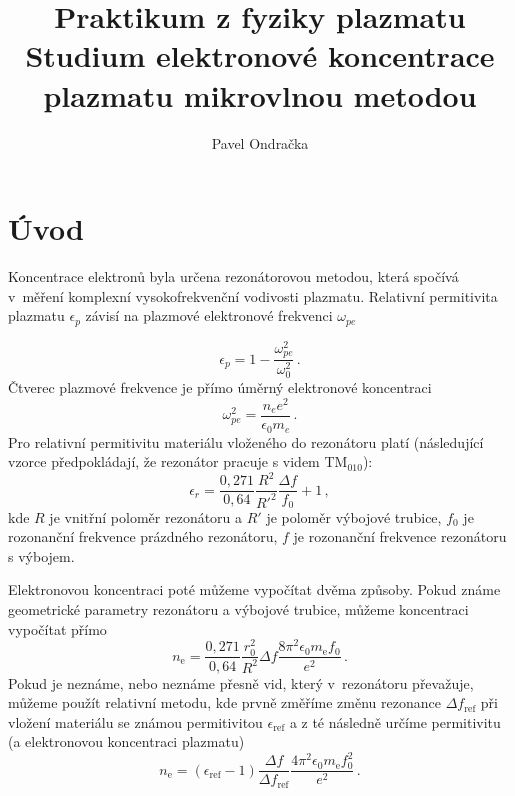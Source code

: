\documentclass[12pt]{article}
\begin{document}
\title{Praktikum z fyziky plazmatu \\
Studium elektronové koncentrace plazmatu mikrovlnou metodou}
\author{Pavel Ondračka}
\maketitle

\section{Úvod}
Koncentrace elektronů byla určena rezonátorovou metodou, která spočívá v~měření komplexní vysokofrekvenční vodivosti plazmatu.
Relativní permitivita plazmatu $\epsilon_p$ závisí na plazmové elektronové frekvenci $\omega_{pe}$ 

\begin{equation}
\epsilon_p = 1 - \frac{\omega_{pe}^2}{\omega_0^2} \, \mathrm{.}
\end{equation}
Čtverec plazmové frekvence je přímo úměrný elektronové koncentraci
\begin{equation}
\omega_{pe}^2 = \frac{n_e e^2}{\epsilon_0 m_e}  \, \mathrm{.}
\end{equation}
Pro relativní permitivitu materiálu vloženého do rezonátoru platí (následující vzorce předpokládají, že rezonátor pracuje s videm TM$_{010}$):
\begin{equation}
\epsilon_r = \frac{0,271}{0,64} \frac{R^2}{R'^2} \frac{\Delta f}{f_0} + 1 \, \mathrm{,}
\end{equation}
kde $R$ je vnitřní poloměr rezonátoru a $R'$ je poloměr výbojové trubice, $f_0$ je rozonanční frekvence prázdného rezonátoru, $f$ je rozonanční frekvence rezonátoru s výbojem.

Elektronovou koncentraci poté můžeme vypočítat dvěma způsoby. Pokud známe geometrické parametry rezonátoru a výbojové trubice, můžeme koncentraci vypočítat přímo
%
\begin{equation}
n_\mathrm{e} = \frac{0,271}{0,64} \frac{r_0^2}{R^2} \Delta f \frac{8 \pi^2 \epsilon_0 m_\mathrm{e} f_0}{e^2} \, \mathrm{.}
\end{equation}
%
Pokud je neznáme, nebo neznáme přesně vid, který v~rezonátoru převažuje, můžeme použít relativní metodu, kde prvně změříme změnu rezonance $\Delta f_\mathrm{ref}$ při vložení materiálu se známou permitivitou $\epsilon_\mathrm{ref}$ a z té následně určíme permitivitu (a elektronovou koncentraci plazmatu)
\begin{equation}
n_\mathrm{e} = (\epsilon_\mathrm{ref}-1) \frac{\Delta f}{\Delta f_\mathrm{ref}} \frac{4 \pi^2 \epsilon_0 m_\mathrm{e} f_0^2}{e^2} \, \mathrm{.}
\end{equation}
\end{document}
